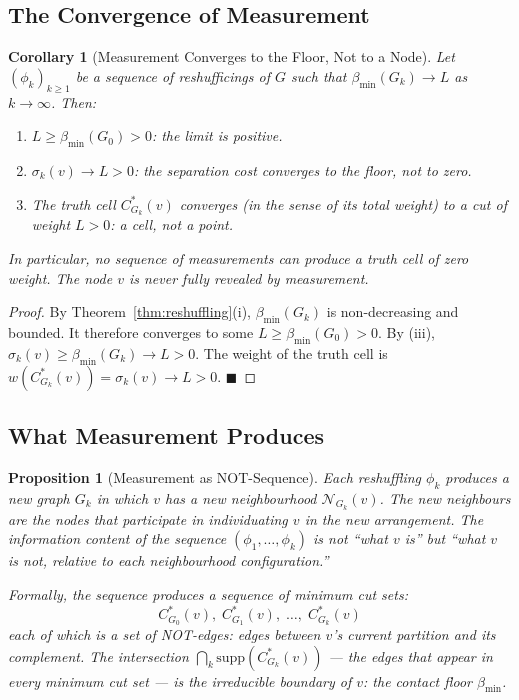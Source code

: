 \documentclass[11pt,twocolumn,a4paper]{article}
\theoremstyle{plain}
\newtheorem{corollary}[theorem]{Corollary}
\newtheorem{proposition}[theorem]{Proposition}
\theoremstyle{definition}
\theoremstyle{remark}
\newcommand{\Nbd}{\mathcal{N}}
\newcommand{\bmin}{\beta_{\min}}
\renewcommand{\qed}{\hfill$\blacksquare$}
\begin{document}
\subsection{The Convergence of Measurement}

\begin{corollary}[Measurement Converges to the Floor, Not to a Node]
\label{cor:convergence}
Let $(\phi_k)_{k \geq 1}$ be a sequence of reshufficings of $G$ such that
$\bmin(G_k) \to L$ as $k \to \infty$. Then:
\begin{enumerate}[label=(\roman*)]
  \item $L \geq \bmin(G_0) > 0$: the limit is positive.
  \item $\sigma_k(v) \to L > 0$: the separation cost converges to the
  floor, not to zero.
  \item The truth cell $C^*_{G_k}(v)$ converges (in the sense of its total
  weight) to a cut of weight $L > 0$: a cell, not a point.
\end{enumerate}
In particular, no sequence of measurements can produce a truth cell of zero
weight. The node $v$ is never fully revealed by measurement.
\end{corollary}

\begin{proof}
By Theorem~\ref{thm:reshuffling}(i), $\bmin(G_k)$ is non-decreasing and
bounded. It therefore converges to some $L \geq \bmin(G_0) > 0$. By (iii),
$\sigma_k(v) \geq \bmin(G_k) \to L > 0$. The weight of the truth cell is
$w(C^*_{G_k}(v)) = \sigma_k(v) \to L > 0$. \qed
\end{proof}

\subsection{What Measurement Produces}

\begin{proposition}[Measurement as NOT-Sequence]
\label{prop:not_sequence}
Each reshuffling $\phi_k$ produces a new graph $G_k$ in which $v$ has a new
neighbourhood $\Nbd_{G_k}(v)$. The new neighbours are the nodes that
participate in individuating $v$ in the new arrangement. The information
content of the sequence $(\phi_1, \ldots, \phi_k)$ is not ``what $v$ is''
but ``what $v$ is not, relative to each neighbourhood configuration.''

Formally, the sequence produces a sequence of minimum cut sets:
\[
  C^*_{G_0}(v),\; C^*_{G_1}(v),\; \ldots,\; C^*_{G_k}(v)
\]
each of which is a set of NOT-edges: edges between $v$'s current partition
and its complement. The intersection $\bigcap_{k} \mathrm{supp}(C^*_{G_k}(v))$
--- the edges that appear in every minimum cut set --- is the irreducible
boundary of $v$: the contact floor $\bmin$.
\end{proposition}
\end{document}
